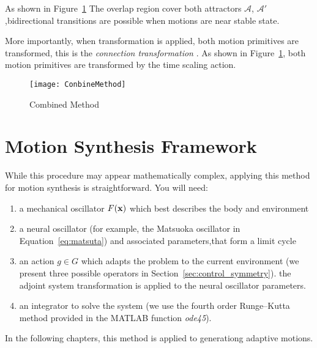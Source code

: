 As shown in Figure~\ref{fig:Combine}
The overlap region cover both attractors $\mathcal{A}$, $\mathcal{A'}$,bidirectional transitions are possible when motions are near stable state.

More importantly, when transformation is applied, both motion primitives are transformed, this is the \emph{connection transformation }. 
As shown in Figure~\ref{fig:Combine}, both motion primitives are transformed by the time scaling action.

\begin{figure}[!htbp]
  \begin{center}
      \texttt{[image: ConbineMethod]}
    \caption{Combined Method}
    \label{fig:Combine}
  \end{center}
\end{figure}

\section{Motion Synthesis Framework}
\label{sec:procframe}
While this procedure may appear mathematically complex, applying this method for motion synthesis is straightforward. 
You will need:
\begin{enumerate}
\item a mechanical oscillator $F(\mathbf{x})$ which best describes the body and environment
\item a neural oscillator (for example, the Matsuoka oscillator in Equation~\ref{eq:matsuta}) and associated parameters,that form a limit cycle

\item an action $g \in G$ which adapts the problem to the current environment (we present three possible operators in Section~\ref{sec:control_symmetry}). the adjoint system transformation  is applied to the neural oscillator parameters.

\item an integrator to solve the system (we use the fourth order Runge--Kutta method provided in the {MATLAB} function \emph{ode45}).
\end{enumerate}
In the following chapters, this method is applied to generationg adaptive motions.



